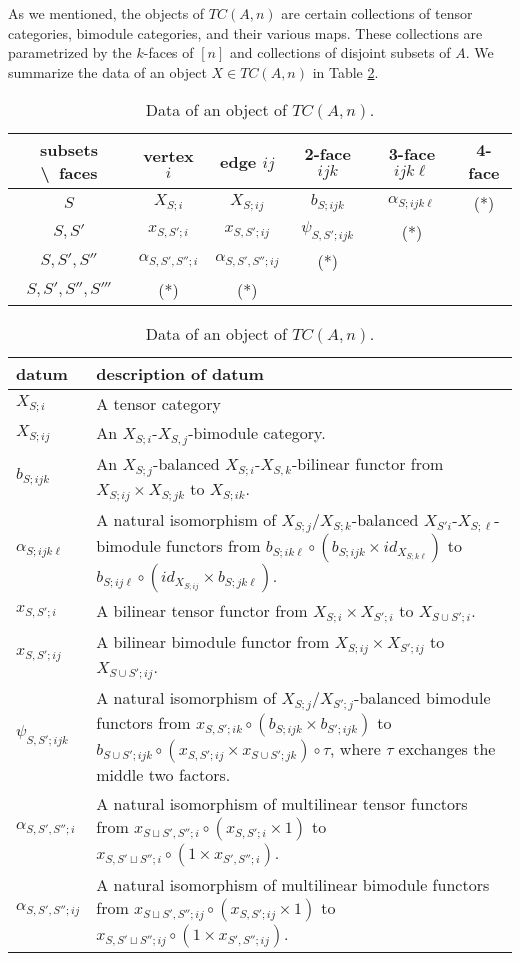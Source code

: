 \documentclass{amsart}
\begin{document}
As we mentioned, the objects of $TC(A,n)$ are certain collections of tensor categories, bimodule categories, and their various maps. These collections are parametrized by the $k$-faces of $[n]$ and collections of disjoint subsets of $A$. We summarize the data of an object $X \in TC(A,n)$ in Table \ref{Table:ObjectOfTC}.
\begin{table}[h]
	\caption{Data of an object of $TC(A,n)$.}
	\begin{tabular}{c |ccccc}
	 subsets \textbackslash\ faces & vertex $i$ & edge $ij$ & 2-face $ijk$ & 3-face $ijk\ell$ & 4-face \\
	\hline
	$S$ 				& $X_{S;i}$ & $X_{S; ij}$ & $b_{S; ijk}$  & $\alpha_{S;ijk\ell}$ & (*) \\
	$S, S'$ 			& $x_{S, S';i}$ & $x_{S, S';ij}$ & $\psi_{S, S'; i j k}$ & (*) & \\
	$S, S', S''$ 		& $\alpha_{S, S', S'';i}$ & $\alpha_{S, S', S'';ij}$ & (*) &  & \\
	\hline
	$S, S', S'', S''' $	& (*) & (*)  &  &  & \\
	\end{tabular}
	
	\vspace{1cm}
	
	\begin{tabular}{l p{11cm}}
		datum & description of datum \\ \hline
		$X_{S;i}$ & A tensor category \\
		$X_{S;ij}$ & An $X_{S;i}$-$X_{S,j}$-bimodule category. \\
		$b_{S; ijk}$ & An $X_{S;j}$-balanced $X_{S;i}$-$X_{S,k}$-bilinear functor from $X_{S;ij}\times X_{S;jk}$ to $X_{S;ik}$. \\
		$\alpha_{S;ijk \ell}$  & A natural isomorphism of $X_{S;j}$/$X_{S;k}$-balanced $X_{S'i}$-$X_{S;\ell}$-bimodule functors from $b_{S;i k \ell} \circ (b_{S;ijk} \times id_{X_{S;k\ell}})$ to $b_{S;ij \ell} \circ (id_{X_{S;ij}} \times b_{S;jk\ell})$. \\ \hline
		$x_{S, S';i}$ & A bilinear tensor functor from $X_{S;i} \times X_{S';i}$ to $X_{S \cup S'; i}$. \\
		$x_{S, S';ij}$ & A bilinear bimodule functor from $X_{S;ij} \times X_{S';ij}$ to $X_{S \cup S'; ij}$. \\
		$\psi_{S, S'; i j k}$ & A natural isomorphism of $X_{S;j} / X_{S';j}$-balanced bimodule functors from $x_{S,S'; ik} \circ (b_{S; ijk} \times b_{S';ijk})$ to $b_{S \cup S'; ijk} \circ (x_{S,S';ij} \times x_{S \cup S'; jk}) \circ  \tau $, where $\tau$ exchanges the middle two factors.  \\ \hline
		$\alpha_{S, S', S'';i}$ & A natural isomorphism of multilinear tensor functors from
		$x_{S \sqcup S', S'';i}\circ (x_{S,S';i} \times 1)$  to 
		$x_{S, S' \sqcup S'';i} \circ (1 \times x_{S', S'';i})$. \\
		$\alpha_{S, S', S'';ij}$ & A natural isomorphism of multilinear bimodule functors from
		$x_{S \sqcup S', S'';ij}\circ (x_{S,S';ij} \times 1)$  to 
		$x_{S, S' \sqcup S'';ij} \circ (1 \times x_{S', S'';ij})$. \\
	\end{tabular}
	\label{Table:ObjectOfTC}
\end{table}
\end{document}
